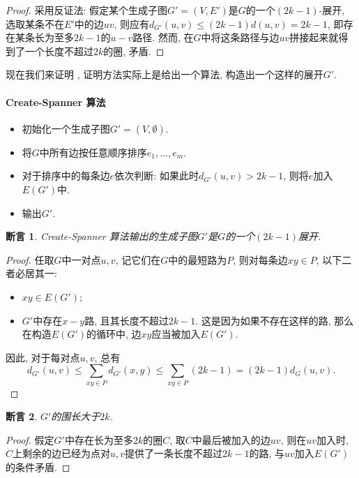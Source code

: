 \documentclass[lang=cn,newtx,10pt,scheme=chinese,chinesefont=nofont,citestyle=gb7714-2015, bibstyle=gb7714-2015]{elegantbook}
\newtheorem{claim}{断言}[chapter]   %
\begin{document}
\begin{refsection}
\begin{proof}
    采用反证法: 假定某个生成子图$G'=(V,E')$是$G$的一个$(2k-1)$-展开, 选取某条不在$E'$中的边$uv$, 则应有$d_{G'}(u,v)\le (2k-1)d(u,v)=2k-1$, 即存在某条长为至多$2k-1$的$u-v$路径. 然而, 在$G$中将这条路径与边$uv$拼接起来就得到了一个长度不超过$2k$的圈, 矛盾.
\end{proof}

现在我们来证明  , 证明方法实际上是给出一个算法, 构造出一个这样的展开$G'$.

\paragraph{Create-Spanner 算法}   
\begin{itemize}
    \item 初始化一个生成子图$G'=(V,\emptyset)$.
    \item 将$G$中所有边按任意顺序排序$e_1,\ldots,e_m$.
    \item 对于排序中的每条边$e$依次判断: 如果此时$d_{G'}(u,v)>2k-1$, 则将$e$加入$E(G')$中.
    \item 输出$G'$.
\end{itemize}

\begin{claim}
    Create-Spanner 算法输出的生成子图$G'$是$G$的一个$(2k-1)$展开.
\end{claim}

\begin{proof}
    任取$G$中一对点$u,v$, 记它们在$G$中的最短路为$P$, 则对每条边$xy\in P$, 以下二者必居其一:
    
    \begin{itemize}
        \item $xy\in E(G')$;
        \item $G'$中存在$x-y$路, 且其长度不超过$2k-1$. 这是因为如果不存在这样的路, 那么在构造$E(G')$的循环中, 边$xy$应当被加入$E(G')$.
    \end{itemize}
    
    因此, 对于每对点$u,v$, 总有
    \[
    d_{G'}(u,v)\le\sum_{xy\in P}d_{G'}(x,y)\le\sum_{xy\in P}(2k-1)=(2k-1)d_{G}(u,v).
    \]
\end{proof}

\begin{claim}
    $G'$的围长大于$2k$.
\end{claim}

\begin{proof}
    假定$G'$中存在长为至多$2k$的圈$C$, 取$C$中最后被加入的边$uv$, 则在$uv$加入时, $C$上剩余的边已经为点对$u,v$提供了一条长度不超过$2k-1$的路, 与$uv$加入$E(G')$的条件矛盾.
\end{proof}


\end{refsection}
\end{document}

